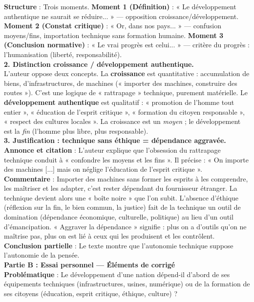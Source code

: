 \documentclass[11pt]{article}
\begin{document}
\begin{exoresolu}
\textbf{Structure} : Trois moments. \textbf{Moment 1 (Définition)} : « Le développement authentique ne saurait se réduire... » — opposition croissance/développement. \textbf{Moment 2 (Constat critique)} : « Or, dans nos pays... » — confusion moyens/fins, importation technique sans formation humaine. \textbf{Moment 3 (Conclusion normative)} : « Le vrai progrès est celui... » — critère du progrès : l'humanisation (liberté, responsabilité).\\
\textbf{2. Distinction croissance / développement authentique.}\\
L'auteur oppose deux concepts. La \textbf{croissance} est quantitative : accumulation de biens, d'infrastructures, de machines (« importer des machines, construire des routes »). C'est une logique de « rattrapage » technique, purement matérielle. Le \textbf{développement authentique} est qualitatif : « promotion de l'homme tout entier », « éducation de l'esprit critique », « formation du citoyen responsable », « respect des cultures locales ». La croissance est un \emph{moyen} ; le développement est la \emph{fin} (l'homme plus libre, plus responsable).\\
\textbf{3. Justification : technique sans éthique = dépendance aggravée.}\\
\textbf{Annonce et citation} : L'auteur explique que l'obsession du rattrapage technique conduit à « confondre les moyens et les fins ». Il précise : « On importe des machines [...] mais on néglige l'éducation de l'esprit critique ».\\
\textbf{Commentaire} : Importer des machines sans former les esprits à les comprendre, les maîtriser et les adapter, c'est rester dépendant du fournisseur étranger. La technique devient alors une « boîte noire » que l'on subit. L'absence d'éthique (réflexion sur la fin, le bien commun, la justice) fait de la technique un outil de domination (dépendance économique, culturelle, politique) au lieu d'un outil d'émancipation. « Aggraver la dépendance » signifie : plus on a d'outils qu'on ne maîtrise pas, plus on est lié à ceux qui les produisent et les contrôlent.\\
\textbf{Conclusion partielle} : Le texte montre que l'autonomie technique suppose l'autonomie de la pensée.\\
\textbf{Partie B : Essai personnel — Éléments de corrigé}\\
\textbf{Problématique} : Le développement d'une nation dépend-il d'abord de ses équipements techniques (infrastructures, usines, numérique) ou de la formation de ses citoyens (éducation, esprit critique, éthique, culture) ?\\

\end{exoresolu}
\end{document}
